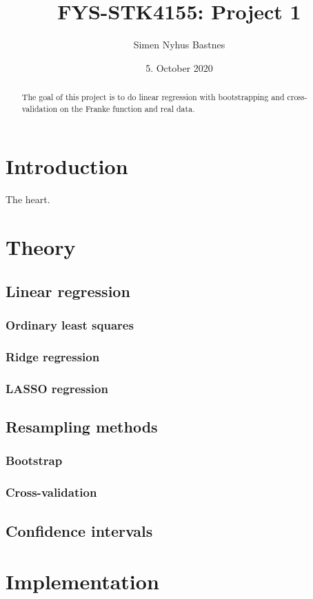\documentclass{article}
\title{FYS-STK4155: Project 1}
\author{Simen Nyhus Bastnes}
\date{5. October 2020}
\begin{document}
\maketitle
\begin{abstract}
The goal of this project is to do linear regression with bootstrapping and cross-validation on the Franke function and real data.
\end{abstract}

\section{Introduction}

The heart.

\section{Theory}
\subsection{Linear regression}
\subsubsection{Ordinary least squares}
\subsubsection{Ridge regression}
\subsubsection{LASSO regression}
\subsection{Resampling methods}
\subsubsection{Bootstrap}
\subsubsection{Cross-validation}
\subsection{Confidence intervals}
\section{Implementation}
\end{document}
